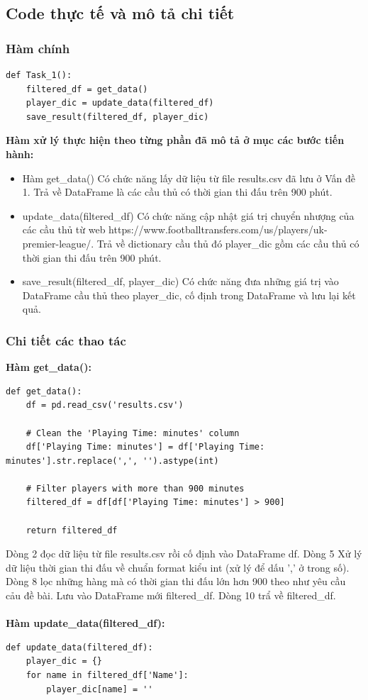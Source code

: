 \documentclass[12pt]{report}
\begin{document}
{\subsection{Code thực tế và mô tả chi tiết}
\subsubsection{Hàm chính}
\begin{lstlisting}
def Task_1():
    filtered_df = get_data()
    player_dic = update_data(filtered_df)
    save_result(filtered_df, player_dic)
\end{lstlisting}
\textbf{Hàm xử lý thực hiện theo từng phần đã mô tả ở mục các bước tiến hành:}
\begin{itemize}
	\item Hàm get\_data() Có chức năng lấy dữ liệu từ file results.csv đã lưu ở Vấn đề 1. Trả về DataFrame là các cầu thủ có thời gian thi đấu trên 900 phút.
	\item update\_data(filtered\_df) Có chức năng cập nhật giá trị chuyển nhượng của các cầu thủ từ web https://www.footballtransfers.com/us/players/uk-premier-league/. Trả về dictionary cầu thủ đó player\_dic gồm các cầu thủ có thời gian thi đấu trên 900 phút.
	\item save\_result(filtered\_df, player\_dic) Có chức năng đưa những giá trị vào DataFrame cầu thủ theo player\_dic, cố định trong DataFrame và lưu lại kết quả.
\end{itemize}
\subsubsection{Chi tiết các thao tác}
\textbf{Hàm get\_data():}\\
\begin{lstlisting}
def get_data():
    df = pd.read_csv('results.csv')

    # Clean the 'Playing Time: minutes' column
    df['Playing Time: minutes'] = df['Playing Time: minutes'].str.replace(',', '').astype(int)

    # Filter players with more than 900 minutes
    filtered_df = df[df['Playing Time: minutes'] > 900]

    return filtered_df
\end{lstlisting}
Dòng 2 đọc dữ liệu từ file results.csv rồi cố định vào DataFrame df. Dòng 5 Xử lý dữ liệu thời gian thi đấu về chuẩn format kiểu int (xử lý để dấu ',' ở trong số). Dòng 8 lọc những hàng mà có thời gian thi đấu lớn hơn 900 theo như yêu cầu cảu đề bài. Lưu vào DataFrame mới filtered\_df. Dòng 10 trẩ về filtered\_df.
\\\\
\textbf{Hàm update\_data(filtered\_df):}\\
\begin{lstlisting}
def update_data(filtered_df):
    player_dic = {}
    for name in filtered_df['Name']:
        player_dic[name] = ''


\end{lstlisting}}
\end{document}
